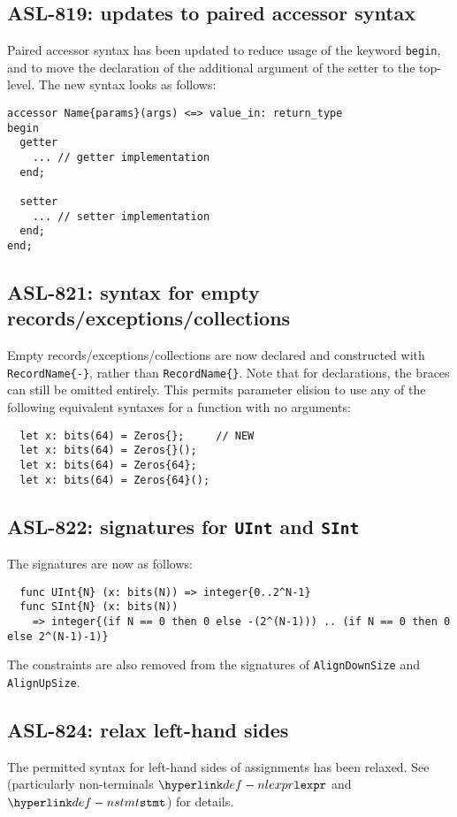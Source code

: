 \subsection{ASL-819: updates to paired accessor syntax}
Paired accessor syntax has been updated to reduce usage of the keyword \texttt{begin}, and to move the declaration of the additional argument of the setter to the top-level.
The new syntax looks as follows:
\begin{lstlisting}
accessor Name{params}(args) <=> value_in: return_type
begin
  getter
    ... // getter implementation
  end;

  setter
    ... // setter implementation
  end;
end;
\end{lstlisting}

\subsection{ASL-821: syntax for empty records/exceptions/collections}
Empty records/exceptions/collections are now declared and constructed with \texttt{RecordName\{-\}}, rather than \texttt{RecordName\{\}}.
Note that for declarations, the braces can still be omitted entirely.
This permits parameter elision to use any of the following equivalent syntaxes for a function with no arguments:
\begin{lstlisting}
  let x: bits(64) = Zeros{};     // NEW
  let x: bits(64) = Zeros{}();
  let x: bits(64) = Zeros{64};
  let x: bits(64) = Zeros{64}();
\end{lstlisting}

\subsection{ASL-822: signatures for \texttt{UInt} and \texttt{SInt}}
The signatures are now as follows:
\begin{lstlisting}
  func UInt{N} (x: bits(N)) => integer{0..2^N-1}
  func SInt{N} (x: bits(N))
    => integer{(if N == 0 then 0 else -(2^(N-1))) .. (if N == 0 then 0 else 2^(N-1)-1)}
\end{lstlisting}

The constraints are also removed from the signatures of \texttt{AlignDownSize} and \texttt{AlignUpSize}.

\subsection{ASL-824: relax left-hand sides}

The permitted syntax for left-hand sides of assignments has been relaxed.
See  (particularly non-terminals $\Nlexpr$ and $\Nstmt$) for details.
